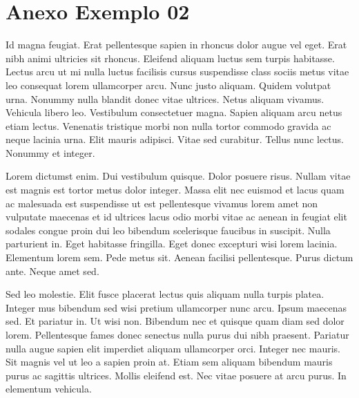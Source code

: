 \chapter{Anexo Exemplo 02}
\noindent
Id magna feugiat. Erat pellentesque sapien in rhoncus dolor augue vel eget. Erat nibh animi ultricies sit rhoncus. Eleifend aliquam luctus sem turpis habitasse. Lectus arcu ut mi nulla luctus facilisis cursus suspendisse class sociis metus vitae leo consequat lorem ullamcorper arcu. Nunc justo aliquam. Quidem volutpat urna. Nonummy nulla blandit donec vitae ultrices. Netus aliquam vivamus. Vehicula libero leo. Vestibulum consectetuer magna. Sapien aliquam arcu netus etiam lectus. Venenatis tristique morbi non nulla tortor commodo gravida ac neque lacinia urna. Elit mauris adipisci. Vitae sed curabitur. Tellus nunc lectus. Nonummy et integer.

Lorem dictumst enim. Dui vestibulum quisque. Dolor posuere risus. Nullam vitae est magnis est tortor metus dolor integer. Massa elit nec euismod et lacus quam ac malesuada est suspendisse ut est pellentesque vivamus lorem amet non vulputate maecenas et id ultrices lacus odio morbi vitae ac aenean in feugiat elit sodales congue proin dui leo bibendum scelerisque faucibus in suscipit. Nulla parturient in. Eget habitasse fringilla. Eget donec excepturi wisi lorem lacinia. Elementum lorem sem. Pede metus sit. Aenean facilisi pellentesque. Purus dictum ante. Neque amet sed.

Sed leo molestie. Elit fusce placerat lectus quis aliquam nulla turpis platea. Integer mus bibendum sed wisi pretium ullamcorper nunc arcu. Ipsum maecenas sed. Et pariatur in. Ut wisi non. Bibendum nec et quisque quam diam sed dolor lorem. Pellentesque fames donec senectus nulla purus dui nibh praesent. Pariatur nulla augue sapien elit imperdiet aliquam ullamcorper orci. Integer nec mauris. Sit magnis vel ut leo a sapien proin at. Etiam sem aliquam bibendum mauris purus ac sagittis ultrices. Mollis eleifend est. Nec vitae posuere at arcu purus. In elementum vehicula.
